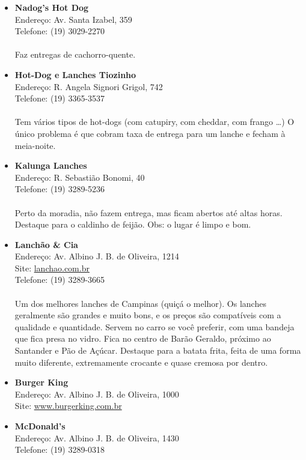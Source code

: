 \begin{itemize}
\item \textbf{Nadog's Hot Dog}
  \\Endereço: Av. Santa Izabel, 359
  \\Telefone: (19) 3029-2270
  \\
  \\Faz entregas de cachorro-quente.
\item \textbf{Hot-Dog e Lanches Tiozinho}
  \\Endereço: R. Angela Signori Grigol, 742
  \\Telefone: (19) 3365-3537
  \\
  \\Tem vários tipos de hot-dogs (com catupiry, com cheddar, com frango
  {\dots}) O único problema é que cobram taxa de entrega para um lanche e
  fecham à meia-noite.
\item \textbf{Kalunga Lanches}
  \\Endereço: R. Sebastião Bonomi, 40
  \\Telefone: (19) 3289-5236
  \\
  \\Perto da moradia, não fazem entrega, mas ficam abertos até altas horas.
  Destaque para o caldinho de feijão. Obs: o lugar é limpo e bom.
\item \textbf{Lanchão \& Cia}
  \\Endereço: Av. Albino J. B. de Oliveira, 1214
  \\Site: \url{lanchao.com.br}
  \\Telefone: (19) 3289-3665
  \\
  \\Um dos melhores lanches de Campinas (quiçá o melhor). Os lanches geralmente
  são grandes e muito bons, e os preços são compatíveis com a qualidade e
  quantidade. Servem no carro se você preferir, com uma bandeja que fica presa
  no vidro. Fica no centro de Barão Geraldo, próximo ao Santander e Pão de
  Açúcar. Destaque para a batata frita, feita de uma forma muito diferente,
  extremamente crocante e quase cremosa por dentro.
\item \textbf{Burger King}
  \\Endereço: Av. Albino J. B. de Oliveira, 1000
  \\Site: \url{www.burgerking.com.br}
\item \textbf{McDonald's}
  \\Endereço: Av. Albino J. B. de Oliveira, 1430
  \\Telefone: (19) 3289-0318

\end{itemize}
